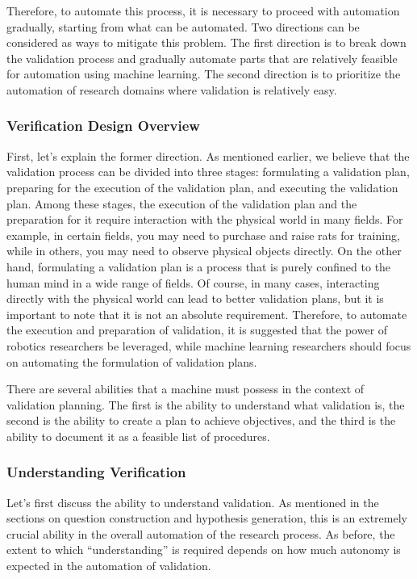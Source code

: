 \documentclass{book}
\begin{document}
Therefore, to automate this process, it is necessary to proceed with automation gradually, starting from what can be automated. Two directions can be considered as ways to mitigate this problem. The first direction is to break down the validation process and gradually automate parts that are relatively feasible for automation using machine learning. The second direction is to prioritize the automation of research domains where validation is relatively easy.

\subsubsection{Verification Design Overview}

First, let's explain the former direction. As mentioned earlier, we believe that the validation process can be divided into three stages: formulating a validation plan, preparing for the execution of the validation plan, and executing the validation plan. Among these stages, the execution of the validation plan and the preparation for it require interaction with the physical world in many fields. For example, in certain fields, you may need to purchase and raise rats for training, while in others, you may need to observe physical objects directly. On the other hand, formulating a validation plan is a process that is purely confined to the human mind in a wide range of fields. Of course, in many cases, interacting directly with the physical world can lead to better validation plans, but it is important to note that it is not an absolute requirement. Therefore, to automate the execution and preparation of validation, it is suggested that the power of robotics researchers be leveraged, while machine learning researchers should focus on automating the formulation of validation plans. 

There are several abilities that a machine must possess in the context of validation planning. The first is the ability to understand what validation is, the second is the ability to create a plan to achieve objectives, and the third is the ability to document it as a feasible list of procedures.

\subsubsection{Understanding Verification}

Let's first discuss the ability to understand validation. As mentioned in the sections on question construction and hypothesis generation, this is an extremely crucial ability in the overall automation of the research process. As before, the extent to which ``understanding'' is required depends on how much autonomy is expected in the automation of validation.
\end{document}
